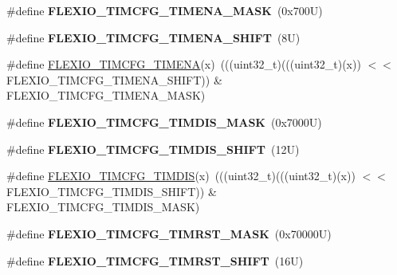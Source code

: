 \begin{DoxyCompactItemize}
\#define {\bfseries F\+L\+E\+X\+I\+O\+\_\+\+T\+I\+M\+C\+F\+G\+\_\+\+T\+I\+M\+E\+N\+A\+\_\+\+M\+A\+SK}~(0x700\+U)
\item 
\mbox{\label{group___f_l_e_x_i_o___register___masks_ga1975e2847b86a73baa9828e62a94836e}} 
\#define {\bfseries F\+L\+E\+X\+I\+O\+\_\+\+T\+I\+M\+C\+F\+G\+\_\+\+T\+I\+M\+E\+N\+A\+\_\+\+S\+H\+I\+FT}~(8\+U)
\item 
\#define \mbox{\hyperlink{group___f_l_e_x_i_o___register___masks_gac63919aab547241e7704c132913a93f1}{F\+L\+E\+X\+I\+O\+\_\+\+T\+I\+M\+C\+F\+G\+\_\+\+T\+I\+M\+E\+NA}}(x)~(((uint32\+\_\+t)(((uint32\+\_\+t)(x)) $<$$<$ F\+L\+E\+X\+I\+O\+\_\+\+T\+I\+M\+C\+F\+G\+\_\+\+T\+I\+M\+E\+N\+A\+\_\+\+S\+H\+I\+FT)) \& F\+L\+E\+X\+I\+O\+\_\+\+T\+I\+M\+C\+F\+G\+\_\+\+T\+I\+M\+E\+N\+A\+\_\+\+M\+A\+SK)
\item 
\mbox{\label{group___f_l_e_x_i_o___register___masks_gaeb2d525a8406a271d7141240012dcbb2}} 
\#define {\bfseries F\+L\+E\+X\+I\+O\+\_\+\+T\+I\+M\+C\+F\+G\+\_\+\+T\+I\+M\+D\+I\+S\+\_\+\+M\+A\+SK}~(0x7000\+U)
\item 
\mbox{\label{group___f_l_e_x_i_o___register___masks_ga090fb66dc1096cb7164f8eb7d7703c0b}} 
\#define {\bfseries F\+L\+E\+X\+I\+O\+\_\+\+T\+I\+M\+C\+F\+G\+\_\+\+T\+I\+M\+D\+I\+S\+\_\+\+S\+H\+I\+FT}~(12\+U)
\item 
\#define \mbox{\hyperlink{group___f_l_e_x_i_o___register___masks_ga4ba451fb40143f46162b95a4127698d3}{F\+L\+E\+X\+I\+O\+\_\+\+T\+I\+M\+C\+F\+G\+\_\+\+T\+I\+M\+D\+IS}}(x)~(((uint32\+\_\+t)(((uint32\+\_\+t)(x)) $<$$<$ F\+L\+E\+X\+I\+O\+\_\+\+T\+I\+M\+C\+F\+G\+\_\+\+T\+I\+M\+D\+I\+S\+\_\+\+S\+H\+I\+FT)) \& F\+L\+E\+X\+I\+O\+\_\+\+T\+I\+M\+C\+F\+G\+\_\+\+T\+I\+M\+D\+I\+S\+\_\+\+M\+A\+SK)
\item 
\mbox{\label{group___f_l_e_x_i_o___register___masks_ga5f56bd10a25ad169600fd8933fa960bf}} 
\#define {\bfseries F\+L\+E\+X\+I\+O\+\_\+\+T\+I\+M\+C\+F\+G\+\_\+\+T\+I\+M\+R\+S\+T\+\_\+\+M\+A\+SK}~(0x70000\+U)
\item 
\mbox{\label{group___f_l_e_x_i_o___register___masks_ga5f2301be2398c3fa3776339e6eca1266}} 
\#define {\bfseries F\+L\+E\+X\+I\+O\+\_\+\+T\+I\+M\+C\+F\+G\+\_\+\+T\+I\+M\+R\+S\+T\+\_\+\+S\+H\+I\+FT}~(16\+U)

\end{DoxyCompactItemize}
